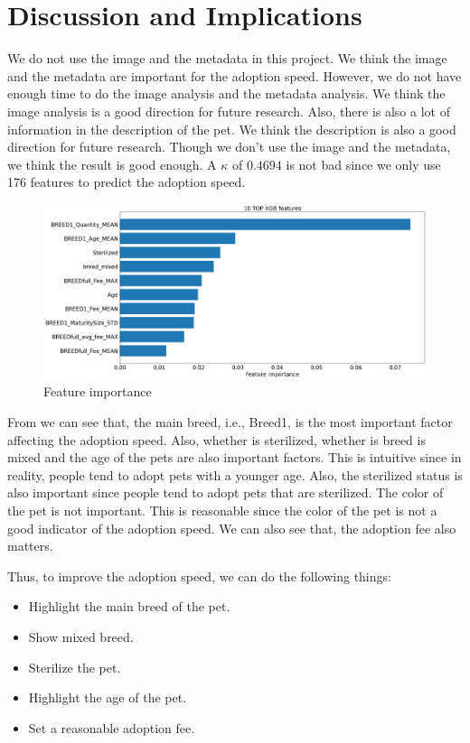 \section{Discussion and Implications}
We do not use the image and the metadata in this project. We think the image and the metadata are important for the adoption speed. However, we do not have enough time to do the image analysis and the metadata analysis. We think the image analysis is a good direction for future research. Also, there is also a lot of information in the description of the pet. We think the description is also a good direction for future research. Though we don't use the image and the metadata, we think the result is good enough. A $\kappa$ of $0.4694$ is not bad since we only use 176 features to predict the adoption speed. 
\begin{figure}[H]
    \centering
    \includegraphics[width=1\textwidth]{code/figure/xgb_feature_importance.png}
    \caption{Feature importance}
    \label{fig:feature_importance}
\end{figure}
From  we can see that, the main breed, i.e., Breed1, is the most important factor affecting the adoption speed. Also, whether is sterilized, whether is breed is mixed and the age of the pets are also important factors. This is intuitive since in reality, people tend to adopt pets with a younger age. Also, the sterilized status is also important since people tend to adopt pets that are sterilized. The color of the pet is not important. This is reasonable since the color of the pet is not a good indicator of the adoption speed. We can also see that, the adoption fee also matters. 

Thus, to improve the adoption speed, we can do the following things:
\begin{itemize}
    \item Highlight the main breed of the pet.
    \item Show mixed breed.
    \item Sterilize the pet.
    \item Highlight the age of the pet.
    \item Set a reasonable adoption fee.
\end{itemize}